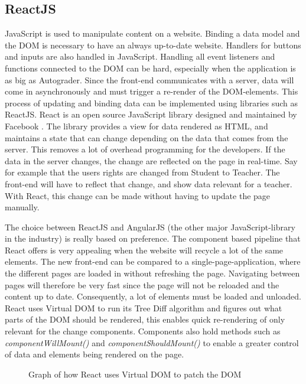 
\subsection{ReactJS}
JavaScript is used to manipulate content on a website. Binding a data model and the DOM is necessary to have an always up-to-date website. Handlers for buttons and inputs are also handled in JavaScript. Handling all event listeners and functions connected to the DOM can be hard, especially when the application is as big as Autograder. Since the front-end communicates with a server, data will come in asynchronously and must trigger a re-render of the DOM-elements. This process of updating and binding data can be implemented using libraries such as ReactJS. React is an open source JavaScript library designed and maintained by Facebook . The library provides a view for data rendered as HTML, and maintains a state that can change depending on the data that comes from the server. This removes a lot of overhead programming for the developers. If the data in the server changes, the change are reflected on the page in real-time. Say for example that the users rights are changed from Student to Teacher. The front-end will have to reflect that change, and show data relevant for a teacher. With React, this change can be made without having to update the page manually. 

The choice between ReactJS and AngularJS (the other major JavaScript-library in the industry) is really based on preference. The component based pipeline that React offers is very appealing when the website will recycle a lot of the same elements. The new front-end can be compared to a single-page-application, where the different pages are loaded in without refreshing the page. Navigating between pages will therefore be very fast since the page will not be reloaded and the content up to date. Consequently, a lot of elements must be loaded and unloaded. React uses Virtual DOM to run its Tree Diff algorithm and figures out what parts of the DOM should be rendered, this enables quick re-rendering of only relevant for the change components. Components also hold methods such as \emph{componentWillMount()} and \emph{componentShouldMount()} to enable a greater control of data and elements being rendered on the page.

\begin{figure}[h]
\centering
{}
\caption{Graph of how React uses Virtual DOM to patch the DOM}
\end{figure}

